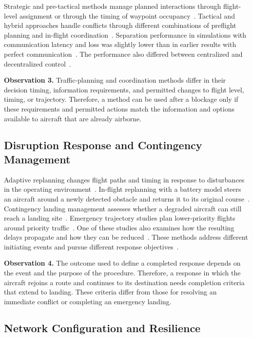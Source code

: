 \documentclass[11pt,letterpaper]{article}
\newcommand{\observation}[2]{\par\noindent\textbf{Observation #1.} #2\par}
\begin{document}
Strategic and pre-tactical methods manage planned interactions through flight-level assignment or through the timing of waypoint occupancy~\cite{Tang2021_L013,Pang2024_L017}. Tactical and hybrid approaches handle conflicts through different combinations of preflight planning and in-flight coordination~\cite{Veytia2022_L051}. Separation performance in simulations with communication latency and loss was slightly lower than in earlier results with perfect communication~\cite{Yang2020_L053}. The performance also differed between centralized and decentralized control~\cite{Yang2020_L053}.

\observation{3}{Traffic-planning and coordination methods differ in their decision timing, information requirements, and permitted changes to flight level, timing, or trajectory. Therefore, a method can be used after a blockage only if these requirements and permitted actions match the information and options available to aircraft that are already airborne.}

\subsection{Disruption Response and Contingency Management}
\label{sec:literature-4}

Adaptive replanning changes flight paths and timing in response to disturbances in the operating environment~\cite{Wu2021_L012}. In-flight replanning with a battery model steers an aircraft around a newly detected obstacle and returns it to its original course~\cite{Kim2024_L042}. Contingency landing management assesses whether a degraded aircraft can still reach a landing site~\cite{Kim2026_L066}. Emergency trajectory studies plan lower-priority flights around priority traffic~\cite{Variny2025_L015,PintoNeto2025_L079}. One of these studies also examines how the resulting delays propagate and how they can be reduced~\cite{Variny2025_L015}. These methods address different initiating events and pursue different response objectives~\cite{Wu2021_L012,Kim2026_L066,PintoNeto2025_L079}.

\observation{4}{The outcome used to define a completed response depends on the event and the purpose of the procedure. Therefore, a response in which the aircraft rejoins a route and continues to its destination needs completion criteria that extend to landing. These criteria differ from those for resolving an immediate conflict or completing an emergency landing.}

\subsection{Network Configuration and Resilience}
\label{sec:literature-5}
\end{document}
